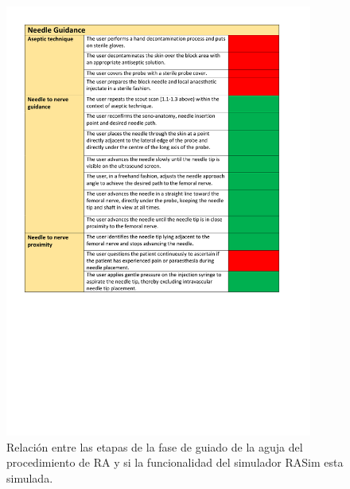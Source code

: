 \begin{figure}[h]
    \centering
    \includegraphics[trim={1cm 85mm 1cm 1cm},clip,width=0.9\textwidth]{PDFs/RA2.pdf}
       \caption{Relación entre las etapas de la fase de guiado de la aguja del procedimiento de \ac{RA} y si la funcionalidad del simulador \ac{RASim} esta simulada.\label{fig:RAsteps2} }
    
\end{figure}
